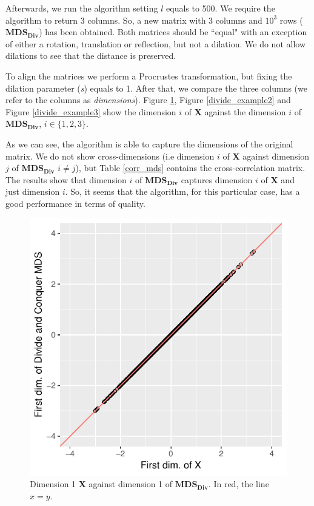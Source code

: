 \documentclass[11pt]{report}
\begin{document}
\indent Afterwards, we run the algorithm setting $l$ equals to 500. We require 
the algorithm to return 3 columns. So, a new matrix with 3 columns and 
$10^3$ rows ($\mathbf{MDS_{Div}}$) has been obtained. Both matrices 
should be ``equal" with an exception of either a rotation, translation or 
reflection, but not a dilation. We do not allow dilations to see that 
the distance is preserved.

\indent To align the matrices we perform a Procrustes transformation, but 
fixing the dilation parameter (\textit{s}) equals to 1. 
After that, we compare the three columns (we refer to the columns as 
\textit{dimensions}). Figure \ref{divide_example1}, Figure \ref{divide_example2} 
and Figure \ref{divide_example3}  show the dimension
$i$ of \textbf{X} against the dimension $i$ of $\mathbf{MDS_{Div}}$, 
$i \in \{1,2,3\}$. 

\indent As we can see, the algorithm is able to capture the dimensions of the 
original matrix. We do not show cross-dimensions (i.e dimension $i$ of \textbf{X}
against dimension $j$ of $\mathbf{MDS_{Div}}$ $ i \neq j$), but Table 
\ref{corr_mds} contains the cross-correlation matrix. The results 
show that dimension  $i$ of  $\mathbf{MDS_{Div}}$ captures dimension 
$i$ of \textbf{X} and just dimension $i$. So, it seems that the algorithm, for 
this particular case, has a good performance in terms of quality.



\begin{figure}
    \centering
    \includegraphics[scale = 1]{./images/first_div.pdf}
    \caption{Dimension 1 \textbf{X} against dimension 1 of $\mathbf{MDS_{Div}}$. In red, the line $x=y$.}
    \label{divide_example1}
\end{figure}
\end{document}
